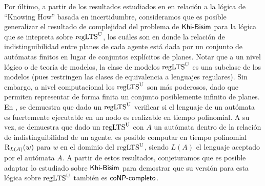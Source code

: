 Por último, a partir de los resultados estudiados en \cite{Demri_Fervari_2023} en relación a la lógica de ``Knowing How'' basada en incertidumbre, 
consideramos que es posible generalizar el resultado de complejidad del problema de $\rm\textsf{Khi-Bisim}$ para la lógica que se intepreta sobre $\rm{regLTS}^U$, los 
cuáles son \ults en donde la relación de indistinguibilidad entre planes de cada agente está dada por un conjunto de autómatas finitos en lugar 
de conjuntos explícitos de planes. 
Notar que a un nivel lógico o de teoría de modelos, la clase de modelos $\rm{regLTS}^U$ es una subclase de los modelos \ults (pues restringen las clases de equivalencia 
a lenguajes regulares). Sin embargo, a nivel computacional los $\rm{regLTS}^U$ son más poderosos, dado que permiten representar de forma finita un conjunto 
posiblemente infinito de planes. En \cite{Demri_Fervari_2023}, se demuestra que dado un $\rm{regLTS}^U$ verificar si el lenguaje de un autómata 
es fuertemente ejecutable en un nodo es realizable en tiempo polinomial. A su vez, se demuestra que dado un $\rm{regLTS}^U$ con $A$ un autómata dentro de la relación de indistinguibilidad de 
un agente, es posible computar en tiempo polinomial $\mathrm{R}_{L(A)}(w)$ para $w$ en el dominio del $\rm{regLTS}^U$, siendo $L(A)$ el lenguaje aceptado 
por el autómata $A$.
A partir de estos resultados, conjeturamos que es posible adaptar lo estudiado sobre $\rm\textsf{Khi-Bisim}$ para demostrar que su versión para 
esta lógica sobre $\rm{regLTS}^U$ también es $\rm\textsf{coNP-completo}$.